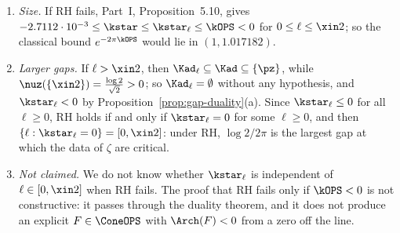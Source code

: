 \begin{remark}
\begin{enumerate}[label=(\arabic*),leftmargin=*]
has $\Arch_q(F_0)=\frac{\log q}{2\pi}\int F_0>0$, and if $(\mu,\nu)$ is admissible for $\Arch_q$ with $\mu\ge c\dd t$ for some $c>0$, then
$(\mu-c\dd t,\nu+\pi c\,\delta_0)$ represents $\Arch_q$ at the gap $0$ but not at the gap $\xin2$, so the analogue of (b) fails. Such pairs exist
unconditionally for every $q\ge1.0172$, by the certified pair of Part~I, Proposition~5.10, at $q=e^{0.02}$, whose zero measure is at least
$4.71949\cdot10^{-4}\dd t$ (the threshold $1.0172$ and the number $1.017182$ in (4) both come from this pair); and under RH for every $q>1$, for
instance $(\muz+\frac{\log q}{2\pi}\dd t,\nuz)$.
\item \emph{Size.} If RH fails, Part~I, Proposition~5.10, gives $-2.7112\cdot10^{-3}\le\kstar\le\kstar_\ell\le\kOPS<0$ for $0\le \ell\le\xin2$; so the
classical bound $e^{-2\pi\kOPS}$ would lie in $(1,1.017182)$.
\item \emph{Larger gaps.} If $\ell>\xin2$, then $\Kad_\ell\subseteq\Kad\subseteq\{\pz\}$, while $\nuz(\{\xin2\})=\frac{\log2}{\sqrt2}>0$; so $\Kad_\ell=\emptyset$
without any hypothesis, and $\kstar_\ell<0$ by Proposition~\ref{prop:gap-duality}(a). Since $\kstar_\ell\le0$ for all $\ell\ge0$, RH holds if and only if
$\kstar_\ell=0$ for some $\ell\ge0$, and then $\{\ell:\kstar_\ell=0\}=[0,\xin2]$: under RH, $\log2/2\pi$ is the largest gap at which the data of $\zeta$ are
critical.
\item \emph{Not claimed.} We do not know whether $\kstar_\ell$ is independent of $\ell\in[0,\xin2]$ when RH fails. The proof that RH fails only if
$\kOPS<0$ is not constructive: it passes through the duality theorem, and it does not produce an explicit $F\in\ConeOPS$ with $\Arch(F)<0$ from
a zero off the line.
\end{enumerate}
\end{remark}

